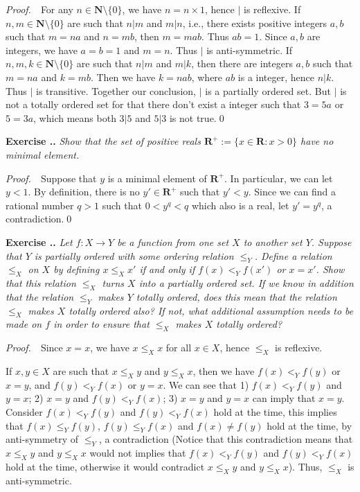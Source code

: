\documentclass{book}
\newcommand{\pff}{\vspace{.25em}\noindent\emph{Proof.}~~}
\newcounter{Exercise}[section]
\renewcommand{\theExercise}{\thesection.\arabic{Exercise}.}
\newcommand{\new}{\vspace{1.5em}\noindent\textbf{{Exercise \stepcounter{Exercise}\textbf{\theExercise}}} }
\begin{document}
\pff For any $n\in\mathbf{N}\setminus\{0\}$, we have $n=n\times 1$, hence $|$ is reflexive. If $n,m\in\mathbf{N}\setminus\{0\}$ are such that $n|m$ and $m|n$, i.e., there exists positive integers $a,b$ such that $m=na$ and $n=mb$, then $m=mab$. Thus $ab=1$. Since $a,b$ are integers, we have $a=b=1$ and $m=n$. Thus $|$ is anti-symmetric. If $n,m,k\in\mathbf{N}\setminus\{0\}$ are such that $n|m$ and $m|k$, then there are integers $a,b$ such that $m=na$ and $k=mb$. Then we have $k=nab$, where $ab$ is a integer, hence $n|k$. Thus $|$ is transitive. Together our conclusion, $|$ is a partially ordered set. But $|$ is not a totally ordered set for that there don't exist a integer such that $3=5a$ or $5=3a$, which means both $3|5$ and $5|3$ is not true.\qed

\new\emph{Show that the set of positive reals $\mathbf{R}^+:=\{x\in\mathbf{R}:x>0\}$ have no minimal element.}

\pff Suppose that $y$ is a minimal element of $\mathbf{R}^+$. In particular, we can let $y<1$. By definition, there is no $y'\in\mathbf{R}^+$ such that $y'<y$. Since we can find a rational number $q>1$ such that $0<y^{q}<q$ which also is a real, let $y'=y^q$, a contradiction.\qed

\new\emph{Let $f:X\to Y$ be a function from one set $X$ to another set $Y$. Suppose that $Y$ is partially ordered with some ordering relation $\leq_Y$. Define a relation $\leq_X$ on $X$ by defining $x\leq_X x'$ if and only if $f(x)<_Y f(x')$ or $x=x'$. Show that this relation $\leq_X$ turns $X$ into a partially ordered set. If we know in addition that the relation $\leq_Y$ makes $Y$ totally ordered, does this mean that the relation $\leq_X$ makes $X$ totally ordered also? If not, what additional assumption needs to be made on $f$ in order to ensure that $\leq_X$ makes $X$ totally ordered?}

\pff Since $x=x$, we have $x\leq_X x$ for all $x\in X$, hence $\leq_X$ is reflexive.

If $x,y\in X$ are such that $x\leq_X y$ and $y\leq_X x$, then we have $f(x)<_Y f(y)$ or $x=y$, and $f(y)<_Y f(x)$ or $y=x$. We can see that 1) $f(x)<_Y f(y)$ and $y=x$; 2) $x=y$ and $f(y)<_Y f(x)$; 3) $x=y$ and $y=x$ can imply that $x=y$. Consider $f(x)<_Y f(y)$ and $f(y)<_Y f(x)$ hold at the time, this implies that $f(x)\leq_Y f(y)$, $f(y)\leq_Y f(x)$ and $f(x)\neq f(y)$ hold at the time, by anti-symmetry of $\leq_Y$, a contradiction (Notice that this contradiction means that $x\leq_X y$ and $y\leq_X x$ would not implies that $f(x)<_Y f(y)$ and $f(y)<_Y f(x)$ hold at the time, otherwise it would contradict $x\leq_X y$ and $y\leq_X x$). Thus, $\leq_X$ is anti-symmetric.
\end{document}

